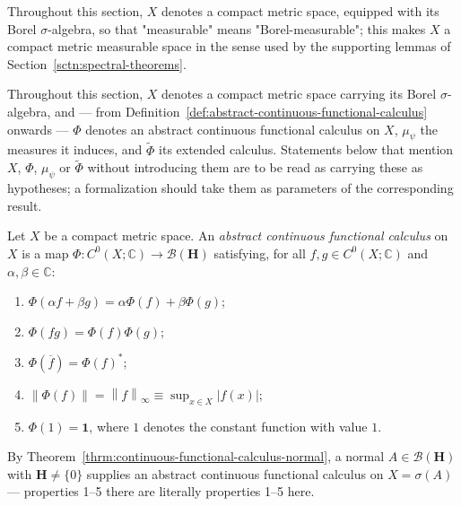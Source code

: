Throughout this section, $X$ denotes a compact metric space, equipped with its Borel $\sigma$-algebra, so that "measurable" means "Borel-measurable"; this makes $X$ a compact metric measurable space in the sense used by the supporting lemmas of Section~\ref{sctn:spectral-theorems}.

\begin{convention}
    \label{conv:section-abstract}
    Throughout this section, $X$ denotes a compact metric space carrying its Borel $\sigma$-algebra, and — from Definition~\ref{def:abstract-continuous-functional-calculus} onwards — $\Phi$ denotes an abstract continuous functional calculus on $X$, $\mu_\psi$ the measures it induces, and $\widetilde\Phi$ its extended calculus. Statements below that mention $X$, $\Phi$, $\mu_\psi$ or $\widetilde\Phi$ without introducing them are to be read as carrying these as hypotheses; a formalization should take them as parameters of the corresponding result.
\end{convention}

\begin{definition}
    \label{def:abstract-continuous-functional-calculus}
    \leanok
    Let $X$ be a compact metric space. An \textit{abstract continuous functional calculus} on $X$ is a map $\Phi : C^0(X;\mathbb{C}) \to \mathcal{B}(\mathbf{H})$ satisfying, for all $f,g \in C^0(X;\mathbb{C})$ and $\alpha,\beta\in\mathbb{C}$:
    \begin{enumerate}
        \item $\Phi(\alpha f + \beta g) = \alpha\Phi(f) + \beta\Phi(g)$;
        \item $\Phi(fg) = \Phi(f)\Phi(g)$;
        \item $\Phi(\overline f) = \Phi(f)^*$;
        \item $\left\| \Phi(f) \right\| = \left\| f \right\|_\infty \equiv \sup_{x \in X}\lvert f(x) \rvert$;
        \item $\Phi(1) = \mathbf{1}$, where $1$ denotes the constant function with value $1$.
    \end{enumerate}
\end{definition}

By Theorem~\ref{thrm:continuous-functional-calculus-normal}, a normal $A \in \mathcal{B}(\mathbf{H})$ with $\mathbf{H}\ne\{0\}$ supplies an abstract continuous functional calculus on $X = \sigma(A)$ — properties 1–5 there are literally properties 1–5 here.

